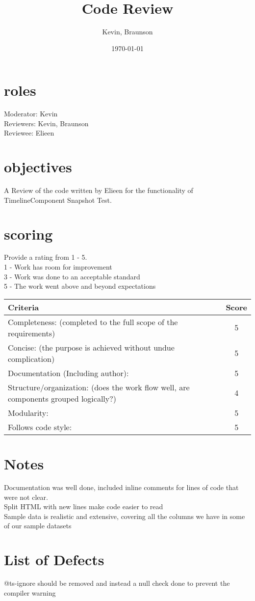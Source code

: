 \documentclass{article}
\title{Code Review}
\author{Kevin, Braunson}
\date{\today}
\begin{document}
\maketitle

\section{roles}
Moderator: Kevin \\
Reviewers: Kevin, Braunson\\
Reviewee: Elieen\\

\section{objectives}
A Review of the code written by Elieen for the functionality of TimelineComponent Snapshot Test. 


\section{scoring}
    Provide a rating from 1 - 5. \\
    1 - Work has room for improvement \\
    3 - Work was done to an acceptable standard \\
    5 - The work went above and beyond expectations\\

\begin{tabular}{|l|c|}
	\hline
	Criteria & Score\\
	\hline
    Completeness:
    (completed to the full scope of the requirements) & 5 \\
	\hline
    Concise:
    (the purpose is achieved without undue complication) & 5 \\
	\hline
    Documentation (Including author): & 5\\
    \hline
    Structure/organization:
    (does the work flow well, are components grouped logically?) & 4\\
    \hline
    Modularity: & 5\\
    \hline
    Follows code style: & 5\\
    \hline
\end{tabular}

\section{Notes}

Documentation was well done, included inline comments for lines of code that were not clear.\\
Split HTML with new lines make code easier to read\\
Sample data is realistic and extensive, covering all the columns we have in some of our sample datasets\\

\pagebreak

\section{List of Defects}
@ts-ignore should be removed and instead a null check done to prevent the compiler warning\\
\end{document}

